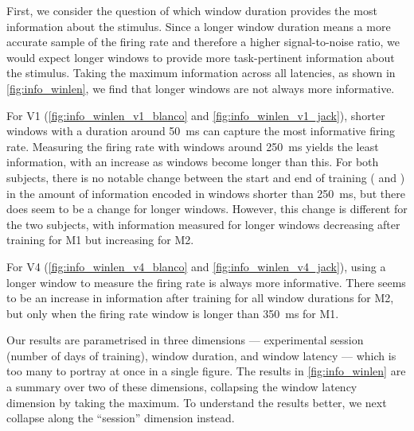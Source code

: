 First, we consider the question of which window duration provides the most information about the stimulus.
Since a longer window duration means a more accurate sample of the firing rate and therefore a higher signal-to-noise ratio, we would expect longer windows to provide more task-pertinent information about the stimulus.
Taking the maximum information across all latencies, as shown in \autoref{fig:info_winlen}, we find that longer windows are not always more informative.

For \ac{V1} (\autoref{fig:info_winlen_v1_blanco} and \autoref{fig:info_winlen_v1_jack}), shorter windows with a duration around \SI{50}{\milli\second} can capture the most informative firing rate.
Measuring the firing rate with windows around \SI{250}{\milli\second} yields the least information, with an increase as windows become longer than this.
For both subjects, there is no notable change between the start and end of training ( and ) in the amount of information encoded in windows shorter than \SI{250}{\milli\second}, but there does seem to be a change for longer windows.
However, this change is different for the two subjects, with information measured for longer windows decreasing after training for \ac{M1} but increasing for \ac{M2}.

For \ac{V4} (\autoref{fig:info_winlen_v4_blanco} and \autoref{fig:info_winlen_v4_jack}), using a longer window to measure the firing rate is always more informative.
There seems to be an increase in information after training for all window durations for \ac{M2}, but only when the firing rate window is longer than \SI{350}{\milli\second} for \ac{M1}.

Our results are parametrised in three dimensions --- experimental session (number of days of training), window duration, and window latency --- which is too many to portray at once in a single figure.
The results in \autoref{fig:info_winlen} are a summary over two of these dimensions, collapsing the window latency dimension by taking the maximum.
To understand the results better, we next collapse along the ``session'' dimension instead.

